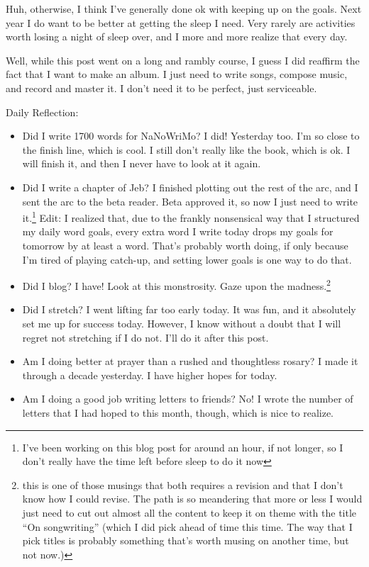 \documentclass[12pt]{article}[titlepage]
\newcommand{\say}[1]{``#1''}
\newcommand{\1}{\={a}}
\newcommand{\2}{\={e}}
\newcommand{\3}{\={\i}}
\newcommand{\4}{\=o}
\newcommand{\5}{\=u}
\newcommand{\6}{\={A}}
\renewcommand{\,}{\textsuperscript{,}}
\begin{document}
Huh, otherwise, I think I've generally done ok with keeping up on the goals.
Next year I do want to be better at getting the sleep I need.
Very rarely are activities worth losing a night of sleep over, and I more and more realize that every day.

Well, while this post went on a long and rambly course, I guess I did reaffirm the fact that I want to make an album.
I just need to write songs, compose music, and record and master it.
I don't need it to be perfect, just serviceable.

Daily Reflection:
\begin{itemize}
\item Did I write 1700 words for NaNoWriMo? I did! Yesterday too. I'm so close to the finish line, which is cool.
I still don't really like the book, which is ok. I will finish it, and then I never have to look at it again.
\item Did I write a chapter of Jeb? I finished plotting out the rest of the arc, and I sent the arc to the beta reader.
Beta approved it, so now I just need to write it.\footnote{I've been working on this blog post for around an hour, if not longer, so I don't really have the time left before sleep to do it now}
Edit: I realized that, due to the frankly nonsensical way that I structured my daily word goals, every extra word I write today drops my goals for tomorrow by at least a word.
That's probably worth doing, if only because I'm tired of playing catch-up, and setting lower goals is one way to do that.
\item Did I blog? I have! Look at this monstrosity. Gaze upon the madness.\footnote{this is one of those musings that both requires a revision and that I don't know how I could revise.
The path is so meandering that more or less I would just need to cut out almost all the content to keep it on theme with the title \say{On songwriting} (which I did pick ahead of time this time.
The way that I pick titles is probably something that's worth musing on another time, but not now.)}
\item Did I stretch? I went lifting far too early today.
It was fun, and it absolutely set me up for success today.
However, I know without a doubt that I will regret not stretching if I do not.
I'll do it after this post.
\item Am I doing better at prayer than a rushed and thoughtless rosary? I made it through a decade yesterday. I have higher hopes for today.
\item Am I doing a good job writing letters to friends? No! I wrote the number of letters that I had hoped to this month, though, which is nice to realize.
\end{itemize}
\end{document}
